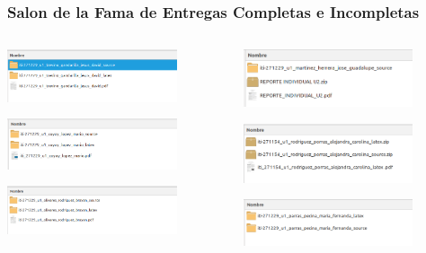\begin{frame}
\frametitle{Salon de la Fama de Entregas Completas e Incompletas}
\begin{columns}
\begin{column}{0.5\textwidth}
\begin{center}
\includegraphics[width=5cm]{Entregables/CasoBien5.png}

\includegraphics[width=5cm]{Entregables/CasoBien4.png}

\includegraphics[width=5cm]{Entregables/CasoBien3.png}
\end{center}

\end{column}
\begin{column}{0.5\textwidth}
\begin{center}
\includegraphics[width=5cm]{Entregables/CasoMal1.png}

\includegraphics[width=5cm]{Entregables/CasoMal2.png}

\includegraphics[width=5cm]{Entregables/CasoMal3.png}
\end{center}

\end{column}
\end{columns}
\end{frame}

